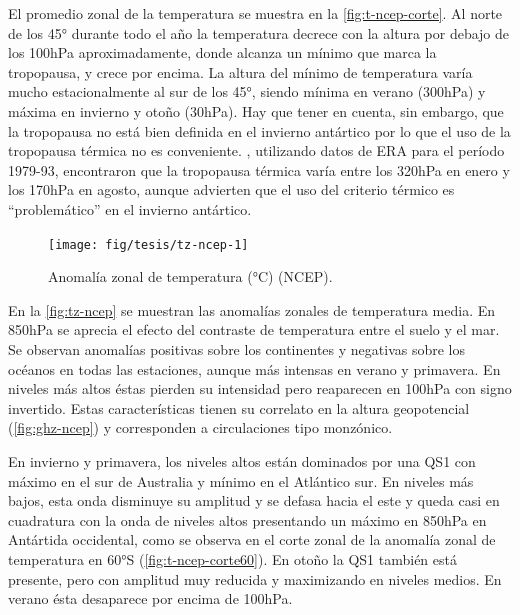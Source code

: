 \documentclass[spanish,a4paper,12pt,oneside]{book}
\begin{document}
El promedio zonal de la temperatura se muestra en la
\autoref{fig:t-ncep-corte}. Al norte de los 45° durante todo el año la
temperatura decrece con la altura por debajo de los 100hPa
aproximadamente, donde alcanza un mínimo que marca la tropopausa, y
crece por encima. La altura del mínimo de temperatura varía mucho
estacionalmente al sur de los 45°, siendo mínima en verano (300hPa) y
máxima en invierno y otoño (30hPa). Hay que tener en cuenta, sin
embargo, que la tropopausa no está bien definida en el invierno
antártico \citep[ \citet{Zangl2001}]{Court1942} por lo que el uso de la
tropopausa térmica no es conveniente. \citet{Zangl2001}, utilizando
datos de ERA para el período 1979-93, encontraron que la tropopausa
térmica varía entre los 320hPa en enero y los 170hPa en agosto, aunque
advierten que el uso del criterio térmico es ``problemático'' en el
invierno antártico.

\begin{landscape}\begin{figure}

{\centering \texttt{[image: fig/tesis/tz-ncep-1]} 

}

\caption{Anomalía zonal de temperatura (°C) (NCEP).}\label{fig:tz-ncep}
\end{figure}
\end{landscape}

En la \autoref{fig:tz-ncep} se muestran las anomalías zonales de
temperatura media. En 850hPa se aprecia el efecto del contraste de
temperatura entre el suelo y el mar. Se observan anomalías positivas
sobre los continentes y negativas sobre los océanos en todas las
estaciones, aunque más intensas en verano y primavera. En niveles más
altos éstas pierden su intensidad pero reaparecen en 100hPa con signo
invertido. Estas características tienen su correlato en la altura
geopotencial (\autoref{fig:ghz-ncep}) y corresponden a circulaciones
tipo monzónico.

En invierno y primavera, los niveles altos están dominados por una QS1
con máximo en el sur de Australia y mínimo en el Atlántico sur. En
niveles más bajos, esta onda disminuye su amplitud y se defasa hacia el
este y queda casi en cuadratura con la onda de niveles altos presentando
un máximo en 850hPa en Antártida occidental, como se observa en el corte
zonal de la anomalía zonal de temperatura en 60°S
(\autoref{fig:t-ncep-corte60}). En otoño la QS1 también está presente,
pero con amplitud muy reducida y maximizando en niveles medios. En
verano ésta desaparece por encima de 100hPa.
\end{document}
